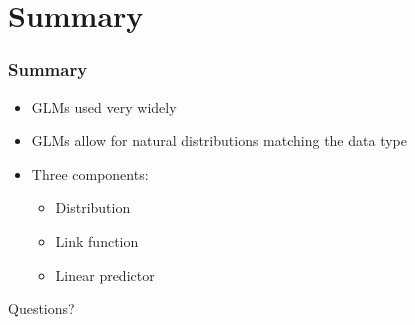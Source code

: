 \documentclass[dvipsnames]{beamer}
\begin{document}
\section{Summary}
\begin{frame}
 \frametitle{Summary}
  \begin{itemize}
  \item<1-> GLMs used very widely
  \item<2-> GLMs allow for natural distributions matching the data type
  \item<3-> Three components: 
    \begin{itemize}
    \item Distribution
    \item Link function
    \item Linear predictor
     \end{itemize}
 \end{itemize}
\end{frame}


\begin{frame}
\begin{center}
Questions? 
\end{center}
\end{frame}
 
\end{document}
